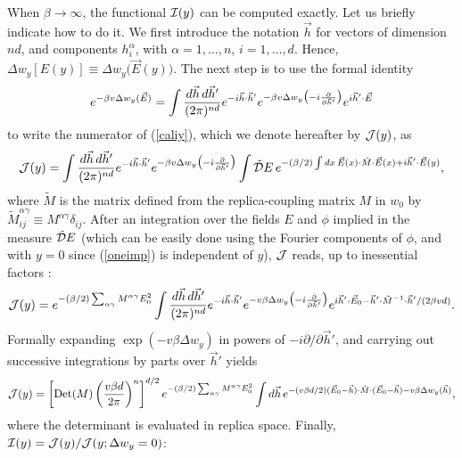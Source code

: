 When $\beta\to\infty$, the functional ${\cal I}(y)$ can be computed
exactly. Let us briefly indicate how to do it. We first introduce the
notation $\vec{h}$ for vectors of dimension $nd$, and components
$h^\alpha_i$, with $\alpha=1,\ldots,n$, $i=1,\ldots,d$.  Hence,
$\Delta w_y[E(y)]\equiv \Delta w_y\bigl(\vec{E}(y)\bigr)$. The next
step is to use the formal identity
\begin{equation}
e^{-\beta v\Delta w_y(\vec{E})}=\int {d\vec{h}\,d\vec{h}'\over
(2\pi)^{nd}}e^{-i\vec{h}\cdot \vec{h}'} e^{-\beta v\Delta
w_y\bigl(-i\frac{\partial}{\partial \vec{h}'}\bigr)} e^{i
\vec{h}'\cdot \vec{E}}
\end{equation}
to write the numerator of (\ref{caliy}), which we denote hereafter by
${\cal J}(y)$, as
\begin{equation}
{\cal J}(y)=\int {d\vec{h}\, d\vec{h}'\over
(2\pi)^{nd}}e^{-i\vec{h}\cdot \vec{h}'} e^{-\beta v \Delta
w_y\bigl(-i\frac{\partial}{\partial\vec{h}'}\bigr)}\int\tilde{\cal
D}E\,e^{-(\beta/2)\int dx\, \vec{E}(x)\cdot \tilde{M} \cdot
\vec{E}(x)+i\vec{h}'\cdot \vec{E}(y)},
\end{equation}
where $\tilde{M}$ is the matrix defined from the replica-coupling
matrix $M$ in $w_0$ by $\tilde{M}^{\alpha\gamma}_{ij}\equiv
M^{\alpha\gamma}\delta_{ij}$. After an integration over the fields $E$
and $\phi$ implied in the measure $\tilde{\cal D}E$ (which can be
easily done using the Fourier components of $\phi$, and with $y=0$
since (\ref{oneimp}) is independent of $y$), $\cal J$ reads, up to
inessential factors \cite{NOTE2}:
\begin{equation}
{\cal J}(y)=e^{-(\beta/2)\sum_{\alpha\gamma}M^{\alpha\gamma}E_0^2}
\int {d\vec{h}\, d\vec{h}'\over (2\pi)^{nd}}e^{-i\vec{h}\cdot \vec{h}'}
e^{-v\beta\Delta w_y\bigl(-i\frac{\partial}{\partial \vec{h}'}\bigr)}
e^{i \vec{h}'\cdot \vec{E}_0-\vec{h}'\cdot \tilde{M}^{-1}
\cdot \vec{h}'/(2\beta v d)}.
\end{equation}
Formally expanding $\exp(-v\beta\Delta w_y)$ in powers of 
$-i\partial/\partial \vec{h}'$, and carrying out successive 
integrations by parts over $\vec{h}'$ yields
\begin{equation}
{\cal J}(y)=\left[\mathop{\text{Det}}(M)\left(\frac{v\beta
d}{2\pi}\right)^n\right]^{d/2}
e^{-(\beta/2)\sum_{\alpha\gamma}M^{\alpha\gamma}E_0^2}\int d\vec{h}\,
e^{-(v \beta d/2)(\vec{E}_0-\vec{h})\cdot
\tilde{M}\cdot(\vec{E}_0-\vec{h})-v\beta\Delta w_y(\vec{h})},
\end{equation}
where the determinant is evaluated in replica space. Finally, 
${\cal I}(y)={\cal J}(y)/{\cal J}(y;\Delta w_y=0)$:
